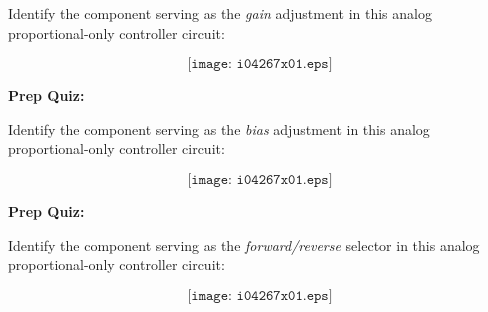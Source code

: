 Identify the component serving as the {\it gain} adjustment in this analog proportional-only controller circuit:

$$\texttt{[image: i04267x01.eps]}$$


\vfil \eject

\noindent
{\bf Prep Quiz:}

Identify the component serving as the {\it bias} adjustment in this analog proportional-only controller circuit:

$$\texttt{[image: i04267x01.eps]}$$


\vfil \eject

\noindent
{\bf Prep Quiz:}

Identify the component serving as the {\it forward/reverse} selector in this analog proportional-only controller circuit:

$$\texttt{[image: i04267x01.eps]}$$





